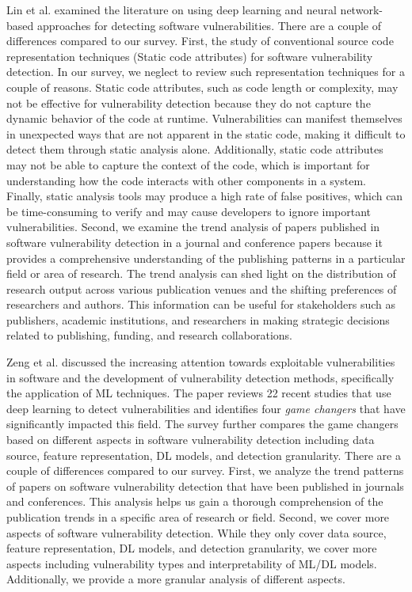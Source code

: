 Lin et al. \cite{lin2020software} examined the literature on using deep learning and neural network-based approaches for detecting software vulnerabilities. There are a couple of differences compared to our survey. First, the study of conventional source code representation techniques (Static code attributes) for software vulnerability detection. In our survey, we neglect to review such representation techniques for a couple of reasons. Static code attributes, such as code length or complexity, may not be effective for vulnerability detection because they do not capture the dynamic behavior of the code at runtime. Vulnerabilities can manifest themselves in unexpected ways that are not apparent in the static code, making it difficult to detect them through static analysis alone. Additionally, static code attributes may not be able to capture the context of the code, which is important for understanding how the code interacts with other components in a system. Finally, static analysis tools may produce a high rate of false positives, which can be time-consuming to verify and may cause developers to ignore important vulnerabilities. Second, we examine the trend analysis of papers published in software vulnerability detection in a journal and conference papers because it provides a comprehensive understanding of the publishing patterns in a particular field or area of research. The trend analysis can shed light on the distribution of research output across various publication venues and the shifting preferences of researchers and authors. This information can be useful for stakeholders such as publishers, academic institutions, and researchers in making strategic decisions related to publishing, funding, and research collaborations.

Zeng et al. \cite{zeng2020software} discussed the increasing attention towards exploitable vulnerabilities in software and the development of vulnerability detection methods, specifically the application of ML techniques. The paper reviews 22 recent studies that use deep learning to detect vulnerabilities and identifies four \textit{game changers} that have significantly impacted this field. The survey further compares the game changers based on different aspects in software vulnerability detection including data source, feature representation, DL models, and detection granularity. There are a couple of differences compared to our survey. First, we analyze the trend patterns of papers on software vulnerability detection that have been published in journals and conferences. This analysis helps us gain a thorough comprehension of the publication trends in a specific area of research or field.
Second, we cover more aspects of software vulnerability detection. While they only cover data source, feature representation, DL models, and detection granularity, we cover more aspects including vulnerability types and interpretability of ML/DL models. Additionally, we provide a more granular analysis of different aspects. 


